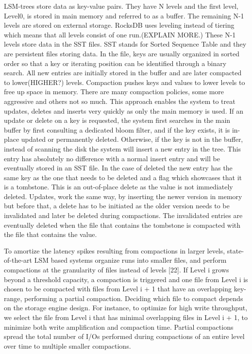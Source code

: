
LSM-trees store data as key-value pairs. They have N levels and the first level, Level0, is stored in main memory and referred to as a buffer.
The remaining N-1 levels are stored on external storage.
RocksDB uses leveling instead of tiering which means that all levels consist of one run.(EXPLAIN MORE.)
These N-1 levels store data in the SST files.
SST stands for Sorted Sequence Table and they are persistent files storing data. 
In the file, keys are usually organized in sorted order so that a key or iterating position can be identified through a binary search.
All new entries are initially stored in the buffer and are later compacted to lower(HIGHER?) levels.
Compaction pushes keys and values to lower levels to free up space in memory.
There are many compaction policies, some more aggressive and others not so much.
This approach enables the system to treat updates, deletes and inserts very quickly as only the main memory is used.
If an update or delete on a key is requested, the system first searches in the main buffer by first consulting a dedicated bloom filter, and if the key exists, it is in-place updated or permanently deleted.
Otherwise, if the key is not in the buffer, instead of scanning the disk the system will insert a new entry in the tree.
This entry has absolutely no difference with a normal insert entry and will be eventually stored in an SST file. 
In the case of deleted the new entry has the same key as the one that needs to be deleted and a flag which showcases that it is a tombstone.
This is an out-of-place delete as the value is not immediately deleted.
Updates, work the same way, by inserting the newer version in memory but before that, a delete has to be initiated as the older version needs to be invalidated and later be deleted during compactions. 
The invalidated entries are eventually deleted when the file that contains the tombstone is compacted with the file that contains the value. 


To amortize the latency spikes resulting from compactions in larger levels, state-of-the-art LSM based systems organize runs into smaller files, and perform compactions at the granularity of files instead of levels [22]. 
If Level i grows beyond a threshold capacity, a compaction is triggered and one file from Level i is chosen to be compacted with files from Level i + 1 that have an overlapping key-range, performing a partial compaction. 
Deciding which file to compact depends on the storage engine design. 
For instance, to optimize for high write throughput, we select the file from Level i that has minimal overlapping files in Level i + 1, to minimize both write amplification and compaction time. 
Partial compactions spread the total number of I/Os performed during compactions of an entire level over time to multiple smaller compactions.

